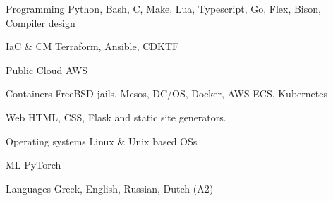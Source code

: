 


\begin{cvskills}


\cvskill
{Programming} %
{Python, Bash, C, Make, Lua, Typescript, Go, Flex, Bison, Compiler design} %


\cvskill
		{IaC \& CM} %
{Terraform, Ansible, CDKTF} %


\cvskill
{Public Cloud} %
{AWS} %


\cvskill
{Containers} %
{FreeBSD jails, Mesos, DC/OS, Docker, AWS ECS, Kubernetes} %


\cvskill
{Web} %
{HTML, CSS, Flask and static site generators.} %


\cvskill
{Operating systems} %
{Linux \& Unix based OSs} %




\cvskill
{ML} %
{PyTorch} %


\cvskill
{Languages} %
{Greek, English, Russian, Dutch (A2)} %

\end{cvskills}
